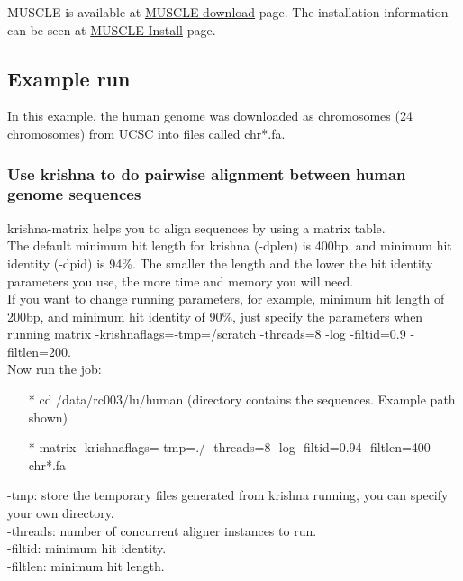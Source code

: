 \documentclass[12pt]{article}
\begin{document}
\noindent MUSCLE is available at \href{https://www.drive5.com/muscle/downloads.htm} {\color{blue}MUSCLE download} page.
\noindent The installation information can be seen at \href{https://www.drive5.com/muscle/manual/install.html} {\color{blue}MUSCLE Install} page.


\subsection{Example run}
In this example, the human genome was downloaded as chromosomes (24 chromosomes) from UCSC into files called chr*.fa.

\subsubsection{Use krishna to do pairwise alignment between human genome sequences}

krishna-matrix helps you to align sequences by using a matrix table. \\

\noindent The default minimum hit length for krishna (-dplen) is 400bp, and minimum hit identity (-dpid) is 94\%. The smaller the length and the lower the hit identity parameters you use, the more time and memory you will need. \\

\noindent If you want to change running parameters, for example, minimum hit length of 200bp, and minimum hit identity of 90\%, just specify the parameters when running matrix {\color{red}-krishnaflags=\textquotedbl-tmp=/scratch -threads=8 -log -filtid=0.9 -filtlen=200\textquotedbl}.\\

\noindent Now run the job:

\begin{enumerate}
	\item[*] cd /data/rc003/lu/human (directory contains the sequences. Example path shown)
	\item[*] matrix -krishnaflags=\textquotedbl-tmp=./ -threads=8 -log -filtid=0.94 -filtlen=400\textquotedbl{} chr*.fa
\end{enumerate}
-tmp: store the temporary files generated from krishna running, you can specify your own directory. \\
-threads:  number of concurrent aligner instances to run. \\
-filtid: minimum hit identity. \\
-filtlen: minimum hit length. \\
\end{document}

